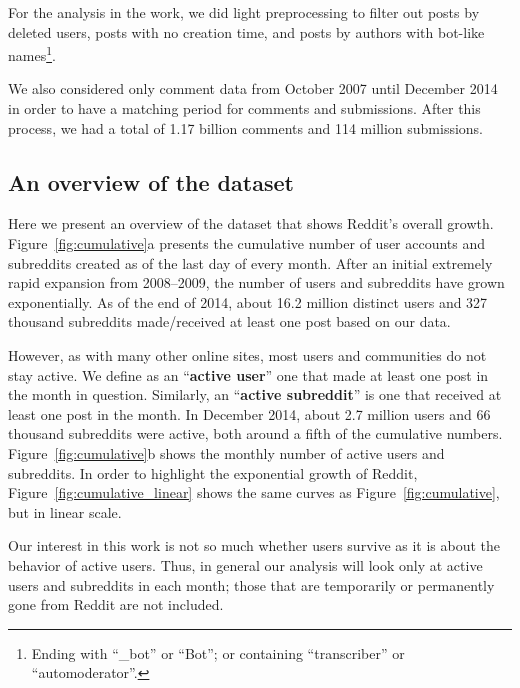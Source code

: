 For the analysis in the work, we did light preprocessing to filter out posts by deleted users, posts with no creation time, and posts by authors with bot-like names\footnote{Ending with ``\_bot'' or ``Bot''; or containing ``transcriber'' or ``automoderator''.}.

We also considered only comment data from October 2007 until December 2014 in order to have a matching period for comments and submissions. After this process, we had a total of 1.17 billion comments and 114 million submissions.

\subsection{An overview of the dataset}

Here we present an overview of the dataset that shows Reddit's overall growth.  Figure~\ref{fig:cumulative}a presents the cumulative number of user accounts and subreddits created as of the last day of every month. After an initial extremely rapid expansion from 2008--2009, the number of users and subreddits have grown exponentially.  As of the end of 2014, about 16.2 million distinct users and 327 thousand subreddits made/received at least one post based on our data.

However, as with many other online sites, most users \cite{Scellato2011,Hughes2009,Java2007} and communities \cite{Arguello2006} do not stay active. We define as an ``\textbf{active user}'' one that made at least one post in the month in question. Similarly, an ``\textbf{active subreddit}'' is one that received at least one post in the month. In December 2014, about 2.7 million users and 66 thousand subreddits were active, both around a fifth of the cumulative numbers. Figure~\ref{fig:cumulative}b shows the monthly number of active users and subreddits. In order to highlight the exponential growth of Reddit, Figure~\ref{fig:cumulative_linear} shows the same curves as Figure~\ref{fig:cumulative}, but in linear scale.

Our interest in this work is not so much whether users survive as it is about the behavior of active users.  Thus, 
in general our analysis will look only at active users and subreddits in each month; those that are temporarily or permanently gone from Reddit are not included.  

